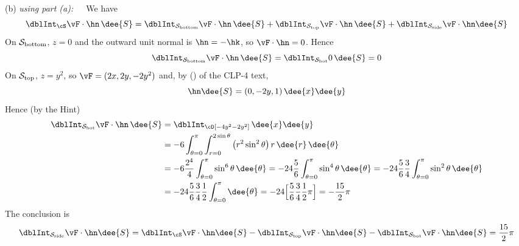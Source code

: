\begin{solution}
(b) \emph{using part (a):}\ \ \ 
We have 
\begin{equation*}
\dblInt_\cS\vF\cdot \hn\,\dee{S}
= \dblInt_{\cal S_{\rm bottom}}\vF\cdot \hn\,\dee{S}
+ \dblInt_{\cal S_{\rm top}}\vF\cdot \hn\,\dee{S}
+ \dblInt_{\cal S_{\rm side}}\vF\cdot \hn\dee{S}
\end{equation*}
On ${\cal S_{\rm bottom}}$, $z=0$ and the outward unit normal is
$\hn=-\hk$, so $\vF\cdot\hn = 0$. Hence
$$
\dblInt_{\cal S_{\rm bottom}}\vF\cdot \hn\,\dee{S}
= \dblInt_{\cal S_{\rm bot}} 0\,\dee{S}
= 0
$$
On ${\cal S_{\rm top}}$, $z=y^2$,
so $\vF = (2x,2y,-2y^2)$ and,  
by () of the CLP-4 text,
$$
\hn\dee{S}
= {(0,-2y,1)}\,\dee{x}\dee{y}
$$
Hence (by the Hint)
\begin{align*}
\dblInt_{\cal S_{\rm bot}}\vF\cdot \hn\,\dee{S}
&= \dblInt_\cD[-4y^2 - 2y^2]\,\dee{x}\dee{y}
\\
&= -6\int_{\theta=0}^{\pi} \int_{r=0}^{2\sin\theta}
\big(r^2\sin^2\theta\big)\,r\,\dee{r}\,\dee{\theta}
\\
&= -6\frac{2^4}{4}\int_{\theta=0}^{\pi} \sin^6\theta\,\dee{\theta}
=-24\frac{5}{6}\int_{\theta=0}^{\pi} \sin^4\theta\,\dee{\theta}
=-24\frac{5}{6}\frac{3}{4}\int_{\theta=0}^{\pi} \sin^2\theta\,\dee{\theta} \\
&=-24\frac{5}{6}\frac{3}{4}\frac{1}{2}\int_{\theta=0}^{\pi}\dee{\theta} 
= -24\Big[\frac{5}{6}\frac{3}{4}\frac{1}{2}\pi\Big]
= -\frac{15}{2}\pi
\end{align*}
The conclusion is
$$
\dblInt_{\cal S_{\rm side}}\vF\cdot \hn\dee{S}
= \dblInt_\cS\vF\cdot \hn\dee{S}
- \dblInt_{\cal S_{\rm top}}\vF\cdot \hn\dee{S}
- \dblInt_{\cal S_{\rm bot}}\vF\cdot \hn\dee{S}
= \frac{15}{2}\pi
$$


\end{solution}
